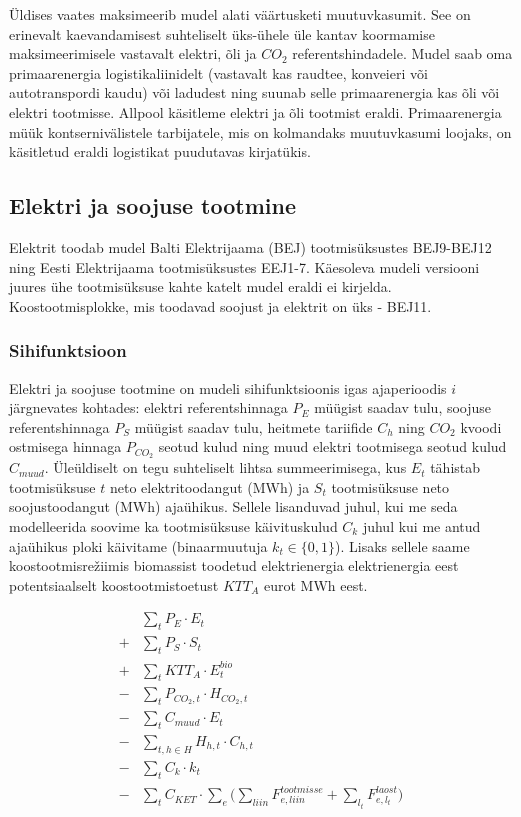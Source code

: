 \documentclass[10pt,a4paper]{article}
\begin{document}
Üldises vaates maksimeerib mudel alati väärtusketi muutuvkasumit. See on erinevalt kaevandamisest suhteliselt üks-ühele üle kantav koormamise maksimeerimisele vastavalt elektri, õli ja $CO_2$ referentshindadele. Mudel saab oma primaarenergia logistikaliinidelt (vastavalt kas raudtee, konveieri või autotranspordi kaudu) või ladudest ning suunab selle primaarenergia kas õli või elektri tootmisse. Allpool käsitleme elektri ja õli tootmist eraldi. Primaarenergia müük kontsernivälistele tarbijatele, mis on kolmandaks muutuvkasumi loojaks, on käsitletud eraldi logistikat puudutavas kirjatükis.

\subsection{Elektri ja soojuse tootmine}
Elektrit toodab mudel Balti Elektrijaama (BEJ) tootmisüksustes BEJ9-BEJ12 ning Eesti Elektrijaama tootmisüksustes EEJ1-7. Käesoleva mudeli versiooni juures ühe tootmisüksuse kahte katelt mudel eraldi ei kirjelda. Koostootmisplokke, mis toodavad soojust ja elektrit on üks - BEJ11.

\subsubsection{Sihifunktsioon}
Elektri ja soojuse tootmine on mudeli sihifunktsioonis igas ajaperioodis $i$ järgne\-vates kohtades: elektri referentshinnaga $P_E$ müügist saadav tulu, soojuse referentshinnaga $P_S$ müügist saadav tulu, heitmete tariifide $C_h$ ning $CO_2$ kvoodi ostmisega hinnaga $P_{CO_2}$ seotud kulud ning muud elektri tootmisega seotud kulud $C_{muud}$. Üleüldiselt on tegu suhteliselt lihtsa summeerimisega, kus $E_t$ tähistab tootmisüksuse $t$ neto elektritoodangut (MWh) ja $S_t$ tootmisüksuse neto soojustoodangut (MWh) ajaühikus. Sellele lisanduvad juhul, kui me seda modelleerida soovime ka tootmisüksuse käivituskulud $C_k$ juhul kui me antud ajaühikus ploki käivitame (binaarmuutuja $k_t \in \{0,1\}$). Lisaks sellele saame koostootmisrežiimis biomassist toodetud elektrienergia elektrienergia eest potentsiaalselt koostootmistoetust $KTT_A$ eurot MWh eest.

\begin{align}
  & \sum_{t} \mathit{P_E} \cdot E_{t} \\
+ & \sum_{t} \mathit{P_S} \cdot S_{t} \\
+ & \sum_{t} KTT_{A} \cdot E^{bio}_{t} \\
- & \sum_{t} P_{CO_2,t} \cdot H_{CO_2,t} \\
- & \sum_{t} C_{muud} \cdot E_{t} \\
- & \sum_{t,h\in H} H_{h,t} \cdot C_{h,t} \\
- & \sum_{t} C_{k} \cdot k_t  \\
- & \sum_{t} C_{KET} \cdot \sum_e \big( \sum_{liin} F^{tootmisse}_{e,liin} + \sum_{l_t} F^{laost}_{e,l_t}\big) 
\end{align}
\end{document}
